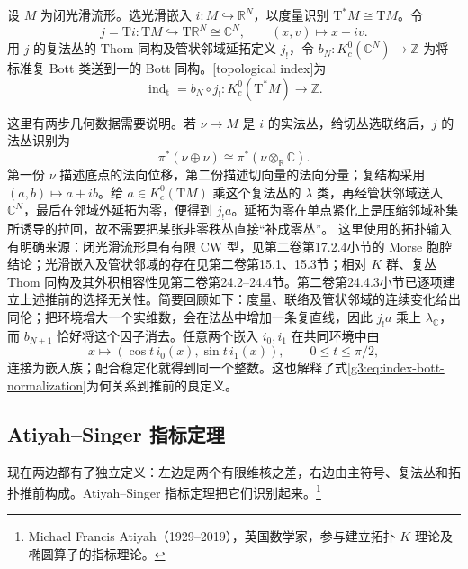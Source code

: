 \begin{definition}\label{g3:def:topological-index}
	设 \(M\) 为闭光滑流形。选光滑嵌入 \(i:M\hookrightarrow\mathbb R^N\)，以度量识别 \(\mathrm T^*M\cong\mathrm TM\)。令
	\[
		j=\mathrm Ti:\mathrm TM\hookrightarrow
		\mathrm T\mathbb R^N\cong\mathbb C^N,
		\qquad (x,v)\longmapsto x+iv.
	\]
	用 \(j\) 的复法丛的 Thom 同构及管状邻域延拓定义 \(j_!\)，令 \(b_N:K_c^0(\mathbb C^N)\to\mathbb Z\) 为将标准复 Bott 类送到一的 Bott 同构。[topological index]为
	\begin{equation}\label{g3:eq:topological-index}
		\operatorname{ind}_{\mathrm t}
		=b_N\circ j_!:
		K_c^0(\mathrm T^*M)\longrightarrow\mathbb Z.
	\end{equation}
\end{definition}

这里有两步几何数据需要说明。若 \(\nu\to M\) 是 \(i\) 的实法丛，给切丛选联络后，\(j\) 的法丛识别为
\[
	\pi^*(\nu\oplus\nu)\cong\pi^*(\nu\otimes_{\mathbb R}\mathbb C).
\]
第一份 \(\nu\) 描述底点的法向位移，第二份描述切向量的法向分量；复结构采用 \((a,b)\mapsto a+ib\)。给 \(a\in K_c^0(\mathrm TM)\) 乘这个复法丛的 \(\lambda\) 类，再经管状邻域送入 \(\mathbb C^N\)，最后在邻域外延拓为零，便得到 \(j_!a\)。延拓为零在单点紧化上是压缩邻域补集所诱导的拉回，故不需要把某张非零秩丛直接“补成零丛”。
\ProseParagraphBreak
这里使用的拓扑输入有明确来源：闭光滑流形具有有限 CW 型，见第二卷第17.2.4小节的 Morse 胞腔结论；光滑嵌入及管状邻域的存在见第二卷第15.1、15.3节；相对 \(K\) 群、复丛 Thom 同构及其外积相容性见第二卷第24.2--24.4节。第二卷第24.4.3小节已逐项建立上述推前的选择无关性。简要回顾如下：度量、联络及管状邻域的连续变化给出同伦；把环境增大一个实维数，会在法丛中增加一条复直线，因此 \(j_!a\) 乘上 \(\lambda_{\mathbb C}\)，而 \(b_{N+1}\) 恰好将这个因子消去。任意两个嵌入 \(i_0,i_1\) 在共同环境中由
\[
	x\longmapsto(\cos t\,i_0(x),\sin t\,i_1(x)),
	\qquad 0\le t\le\pi/2,
\]
连接为嵌入族；配合稳定化就得到同一个整数。这也解释了式\eqref{g3:eq:index-bott-normalization}为何关系到推前的良定义。

\subsection{Atiyah–Singer 指标定理}
\label{g3:subsec:1704:03}
现在两边都有了独立定义：左边是两个有限维核之差，右边由主符号、复法丛和拓扑推前构成。Atiyah--Singer 指标定理把它们识别起来。\footnote{Michael Francis Atiyah（1929--2019），英国数学家，参与建立拓扑 \(K\) 理论及椭圆算子的指标理论。}

